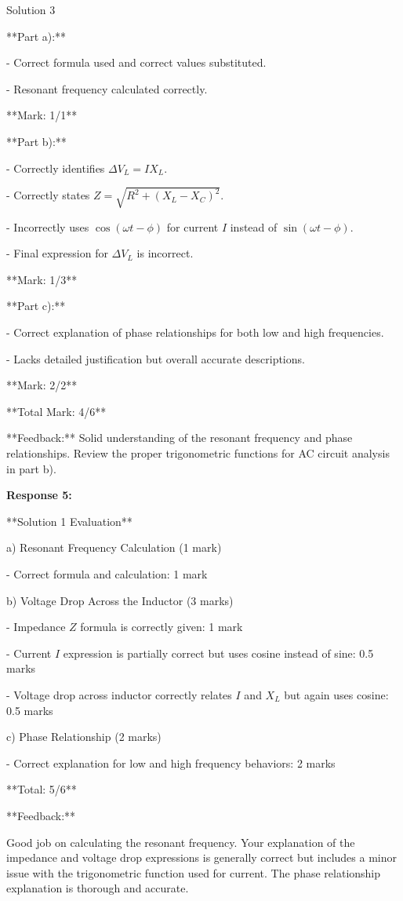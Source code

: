 \documentclass[a4paper,11pt]{article}
\begin{document}
Solution 3

**Part a):**

- Correct formula used and correct values substituted.

- Resonant frequency calculated correctly.

**Mark: 1/1**

**Part b):**

- Correctly identifies \( \Delta V_L = I X_L \).

- Correctly states \( Z = \sqrt{R^2 + (X_L - X_C)^2} \).

- Incorrectly uses \( \cos(\omega t - \phi) \) for current \( I \) instead of \( \sin(\omega t - \phi) \).

- Final expression for \( \Delta V_L \) is incorrect.

**Mark: 1/3**

**Part c):**

- Correct explanation of phase relationships for both low and high frequencies.

- Lacks detailed justification but overall accurate descriptions.

**Mark: 2/2**

**Total Mark: 4/6**

**Feedback:** Solid understanding of the resonant frequency and phase relationships. Review the proper trigonometric functions for AC circuit analysis in part b).

\bigskip
\textbf{Response 5:}

**Solution 1 Evaluation**

a) Resonant Frequency Calculation (1 mark)

- Correct formula and calculation: 1 mark

b) Voltage Drop Across the Inductor (3 marks)

- Impedance \( Z \) formula is correctly given: 1 mark

- Current \( I \) expression is partially correct but uses cosine instead of sine: 0.5 marks

- Voltage drop across inductor correctly relates \( I \) and \( X_L \) but again uses cosine: 0.5 marks

c) Phase Relationship (2 marks)

- Correct explanation for low and high frequency behaviors: 2 marks

**Total: 5/6**

**Feedback:**

Good job on calculating the resonant frequency. Your explanation of the impedance and voltage drop expressions is generally correct but includes a minor issue with the trigonometric function used for current. The phase relationship explanation is thorough and accurate.
\end{document}
